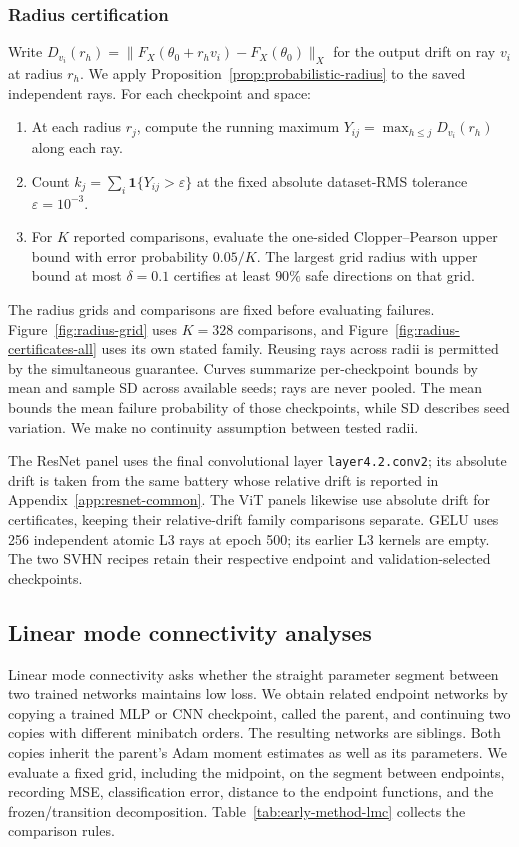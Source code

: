 \subsubsection{Radius certification}
\label{app:methods-certificates}
Write $D_{v_i}(r_h)=\|F_X(\theta_0+r_hv_i)-F_X(\theta_0)\|_X$ for the output drift on ray $v_i$ at radius $r_h$.
We apply Proposition~\ref{prop:probabilistic-radius} to the saved independent rays. For each checkpoint and space:
\begin{enumerate}
\item At each radius $r_j$, compute the running maximum $Y_{ij}=\max_{h\le j}D_{v_i}(r_h)$ along each ray.
\item Count $k_j=\sum_i\mathbf1\{Y_{ij}>\varepsilon\}$ at the fixed absolute dataset-RMS tolerance $\varepsilon=10^{-3}$.
\item For $K$ reported comparisons, evaluate the one-sided Clopper--Pearson upper bound with error probability $0.05/K$. The largest grid radius with upper bound at most $\delta=0.1$ certifies at least $90\%$ safe directions on that grid.
\end{enumerate}
The radius grids and comparisons are fixed before evaluating failures. Figure~\ref{fig:radius-grid} uses $K=328$ comparisons, and Figure~\ref{fig:radius-certificates-all} uses its own stated family. Reusing rays across radii is permitted by the simultaneous guarantee. Curves summarize per-checkpoint bounds by mean and sample SD across available seeds; rays are never pooled. The mean bounds the mean failure probability of those checkpoints, while SD describes seed variation. We make no continuity assumption between tested radii.

The ResNet panel uses the final convolutional layer \texttt{layer4.2.conv2}; its absolute drift is taken from the same battery whose relative drift is reported in Appendix~\ref{app:resnet-common}. The ViT panels likewise use absolute drift for certificates, keeping their relative-drift family comparisons separate. GELU uses 256 independent atomic L3 rays at epoch 500; its earlier L3 kernels are empty. The two SVHN recipes retain their respective endpoint and validation-selected checkpoints.

\subsection{Linear mode connectivity analyses}
\label{app:methods-lmc}
Linear mode connectivity asks whether the straight parameter segment between two trained networks maintains low loss. We obtain related endpoint networks by copying a trained MLP or CNN checkpoint, called the parent, and continuing two copies with different minibatch orders. The resulting networks are siblings. Both copies inherit the parent's Adam moment estimates as well as its parameters. We evaluate a fixed grid, including the midpoint, on the segment between endpoints, recording MSE, classification error, distance to the endpoint functions, and the frozen/transition decomposition. Table~\ref{tab:early-method-lmc} collects the comparison rules.

